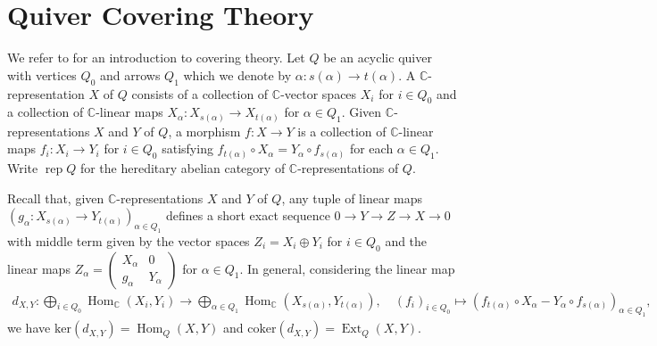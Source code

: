 \documentclass{amsart}
\numberwithin{equation}{section}
\newcommand{\C}{\mathbb{C}}
\newcommand{\rep}{\operatorname{rep}}
\newcommand{\CC}{\mathbb{C}}
\newcommand{\Ext}{\operatorname{Ext}}
\newcommand{\Hom}{\operatorname{Hom}}
\newcommand{\ses}[3]{0\rightarrow #1\rightarrow #2\rightarrow#3\rightarrow 0}
\begin{document}
\section{Quiver Covering Theory}
\label{sec:covering}

We refer to \cite{gab} for an introduction to covering theory.
Let $Q$ be an acyclic quiver with vertices $Q_0$ and arrows $Q_1$ which we denote by $\alpha:s(\alpha)\to t(\alpha)$.
A $\CC$-representation $X$ of $Q$ consists of a collection of $\CC$-vector spaces $X_i$ for $i\in Q_0$ and a collection of $\CC$-linear maps $X_\alpha:X_{s(\alpha)}\to X_{t(\alpha)}$ for $\alpha\in Q_1$.
Given $\CC$-representations $X$ and $Y$ of $Q$, a morphism $f:X\to Y$ is a collection of $\CC$-linear maps $f_i:X_i\to Y_i$ for $i\in Q_0$ satisfying $f_{t(\alpha)}\circ X_\alpha=Y_\alpha\circ f_{s(\alpha)}$ for each $\alpha\in Q_1$.
Write $\rep Q$ for the hereditary abelian category of $\C$-representations of $Q$.

Recall that, given $\CC$-representations $X$ and $Y$ of $Q$, any tuple of linear maps $(g_\alpha:X_{s(\alpha)}\to Y_{t(\alpha)})_{\alpha\in Q_1}$ defines a short exact sequence $\ses{Y}{Z}{X}$ with middle term given by the vector spaces $Z_i=X_i\oplus Y_i$ for $i\in Q_0$ and the linear maps $Z_\alpha=\begin{pmatrix} X_\alpha & 0 \\ g_\alpha & Y_\alpha \end{pmatrix}$ for $\alpha\in Q_1$. 
In general, considering the linear map  
\begin{align}
  \label{eq:homext}
  d_{X,Y}:\bigoplus_{i\in Q_0}\Hom_\CC(X_i,Y_i)\to\bigoplus_{\alpha\in Q_1}\Hom_\CC(X_{s(\alpha)},Y_{t(\alpha)}),
  \quad (f_i)_{i\in Q_0}\mapsto(f_{t(\alpha)}\circ X_\alpha-Y_\alpha\circ f_{s(\alpha)})_{\alpha\in Q_1},
\end{align}
we have $\mathrm{ker}(d_{X,Y})=\Hom_Q(X,Y)$ and $\mathrm{coker}(d_{X,Y})=\Ext_Q(X,Y)$.
\end{document}
